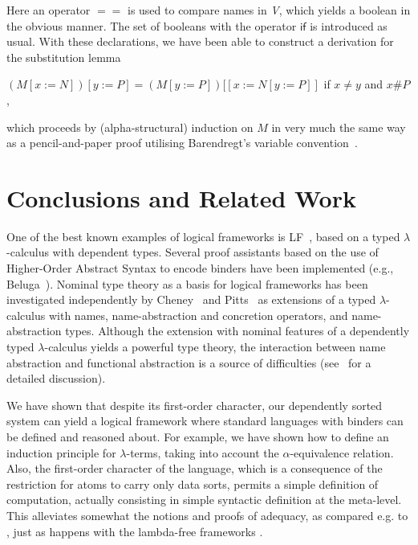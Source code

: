 \documentclass[11pt,a4paper]{amsart}
\newcounter{s}
\newcommand{\fresh}[2]{#1 \# #2}
\newcommand{\name}{\textsl{V}}
\begin{document}
Here an operator $\mathsf{==}$ is used to compare names in \name, which yields a boolean in the obvious manner. The set of booleans with the operator $\mathsf{if}$ is introduced as usual.
With these declarations, we have been able to construct a derivation for the substitution lemma

$(M[x := N])[y := P] = (M[y := P])[[x := N[y := P]]$ if $x \not = y$ and $\fresh{x}{P}$,

\noindent which proceeds by (alpha-structural) induction on $M$ in very much the same way as a pencil-and-paper proof utilising Barendregt's variable convention~\cite{BarendregtH:lamcss}.

\section{Conclusions and Related Work}
\label{section:related-work}

One of the best known examples of logical frameworks is LF~\cite{harper:fradl}, based on a typed $\lambda$-calculus with
dependent types. 
Several proof assistants based on the use of Higher-Order Abstract Syntax to encode binders have been implemented (e.g., Beluga~\cite{Beluga}).
Nominal type theory as a basis for logical frameworks has been investigated independently by Cheney~\cite{CheneyJ:sntt,CheneyJ:depntt} and Pitts~\cite{PittsA:deptta} as extensions of a typed $\lambda$-calculus with names, name-abstraction and concretion operators, and name-abstraction types. 
Although the extension with nominal features of a dependently typed $\lambda$-calculus yields a powerful type theory,  the interaction between name abstraction and functional abstraction is a source of difficulties (see~\cite{CheneyJ:sntt} for a detailed discussion). 

We have shown that despite its first-order character, our dependently sorted system can yield a logical framework where standard languages with binders can be defined and reasoned about. For example, we have shown how to define an induction principle for $\lambda$-terms,  taking into account the  $\alpha$-equivalence relation.  
Also, the first-order character of the language, which is a consequence of the restriction for atoms to carry only data sorts, permits a simple definition of computation, actually consisting in simple syntactic definition at the meta-level. This alleviates somewhat the notions and proofs of adequacy, as compared e.g. to \cite{harper:fradl}, just as happens with the lambda-free frameworks \cite{AdamsR:lamfree}.
\end{document}
